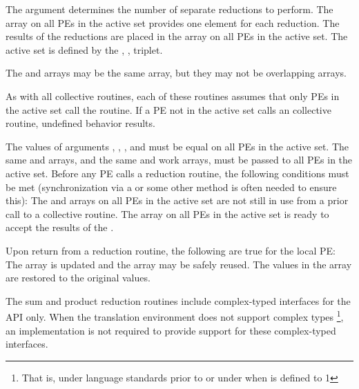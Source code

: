 \begin{apidefinition}
{    The  argument determines the number of separate reductions to
    perform.  The \source{} array on all \acp{PE} in the active set provides one
    element for each reduction.  The results of the reductions are placed in the
    \dest{} array on all \acp{PE} in the active set.  The active set is defined
    by the , ,  triplet.
    
    The \source{} and \dest{} arrays may be the same array, but they may not be
    overlapping arrays.
    
    As with all \openshmem collective routines, each of these routines assumes
    that only \acp{PE} in the active set call the routine.  If a \ac{PE} not in
    the active set calls an \openshmem collective routine, undefined behavior
    results.
    
    The values of arguments , , , and
     must be equal on all \acp{PE} in the active set. The same \dest{}
    and \source{} arrays, and the same  and  work arrays, must
    be passed to all \acp{PE} in the active set.
    Before any \ac{PE} calls a reduction routine, the
    following conditions must be met (synchronization via a  or some other
    method is often needed to ensure this): The  and  arrays
    on all \acp{PE} in the active set are not still in use from a prior call to a
    collective \openshmem routine.  The \dest{} array on all \acp{PE} in the
    active set is ready to accept the results of the .
    
    Upon return from a reduction routine, the following are true for the local
    \ac{PE}: The \dest{} array is updated and the \source{} array may be safely reused.  
    The values in the  array are
    restored to the original values.

    The sum and product reduction routines include complex-typed interfaces
    for the \Cstd API only.
    When the \Cstd translation environment does not support complex types%
    \footnote{That is, under \Cstd language standards prior to \Cstd[99] or
      under \Cstd[11] when  is defined to 1},
    an \openshmem implementation is not required to provide support for
    these complex-typed interfaces.
}


\end{apidefinition}
